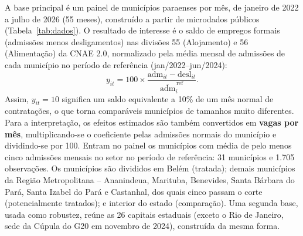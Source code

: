 \documentclass[12pt,a4paper]{article}
\begin{document}
A base principal é um painel de municípios paraenses por mês, de janeiro de 2022 a julho de 2026
(55 meses), construído a partir de microdados públicos (Tabela~\ref{tab:dados}). O resultado de
interesse é o saldo de empregos formais (admissões menos desligamentos) nas divisões 55 (Alojamento)
e 56 (Alimentação) da CNAE 2.0, normalizado pela média mensal de admissões de cada município no
período de referência (jan/2022--jun/2024):
\begin{equation}
y_{it} = 100 \times \frac{\text{adm}_{it} - \text{desl}_{it}}{\overline{\text{adm}}_{i}^{\,\text{ref}}}.
\end{equation}
Assim, $y_{it} = 10$ significa um saldo equivalente a 10\% de um mês normal de contratações, o que
torna comparáveis municípios de tamanhos muito diferentes. Para a interpretação, os efeitos estimados
são também convertidos em \textbf{vagas por mês}, multiplicando-se o coeficiente pelas admissões
normais do município e dividindo-se por 100. Entram no painel os municípios com média de pelo menos
cinco admissões mensais no setor no período de referência: 31 municípios e 1.705 observações. Os
municípios são divididos em Belém (tratada); demais municípios da Região Metropolitana -- Ananindeua,
Marituba, Benevides, Santa Bárbara do Pará, Santa Izabel do Pará e Castanhal, dos quais cinco passam o
corte (potencialmente tratados); e interior do estado (comparação). Uma segunda base, usada como
robustez, reúne as 26 capitais estaduais (exceto o Rio de Janeiro, sede da Cúpula do G20 em novembro
de 2024), construída da mesma forma.
\end{document}
